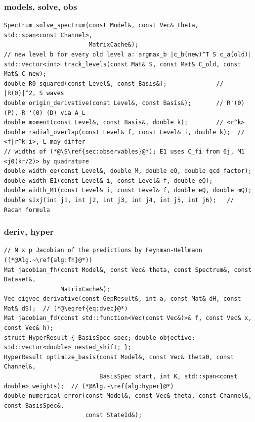 \documentclass[11pt,a4paper]{article}
\numberwithin{equation}{section}
\theoremstyle{definition}
\theoremstyle{plain}
\theoremstyle{remark}
\numberwithin{algorithm}{section}
\begin{document}
\subsubsection*{models, solve, obs}
\begin{lstlisting}[style=cpp]
Spectrum solve_spectrum(const Model&, const Vec& theta, std::span<const Channel>,
                        MatrixCache&);
// new level b for every old level a: argmax_b |c_b(new)^T S c_a(old)|
std::vector<int> track_levels(const Mat& S, const Mat& C_old, const Mat& C_new);
double R0_squared(const Level&, const Basis&);              // |R(0)|^2, S waves
double origin_derivative(const Level&, const Basis&);       // R'(0) (P), R''(0) (D) via A_L
double moment(const Level&, const Basis&, double k);        // <r^k>
double radial_overlap(const Level& f, const Level& i, double k);  // <f|r^k|i>, L may differ
// widths of (*@\S\ref{sec:observables}@*); E1 uses C_fi from 6j, M1 <j0(kr/2)> by quadrature
double width_ee(const Level&, double M, double eQ, double qcd_factor);
double width_E1(const Level& i, const Level& f, double eQ);
double width_M1(const Level& i, const Level& f, double eQ, double mQ);
double sixj(int j1, int j2, int j3, int j4, int j5, int j6);   // Racah formula
\end{lstlisting}

\subsubsection*{deriv, hyper}
\begin{lstlisting}[style=cpp]
// N x p Jacobian of the predictions by Feynman-Hellmann ((*@Alg.~\ref{alg:fh}@*))
Mat jacobian_fh(const Model&, const Vec& theta, const Spectrum&, const Dataset&,
                MatrixCache&);
Vec eigvec_derivative(const GepResult&, int a, const Mat& dH, const Mat& dS);  // (*@\eqref{eq:dvec}@*)
Mat jacobian_fd(const std::function<Vec(const Vec&)>& f, const Vec& x, const Vec& h);
struct HyperResult { BasisSpec spec; double objective; std::vector<double> nested_shift; };
HyperResult optimize_basis(const Model&, const Vec& theta0, const Channel&,
                           BasisSpec start, int K, std::span<const double> weights);  // (*@Alg.~\ref{alg:hyper}@*)
double numerical_error(const Model&, const Vec& theta, const Channel&, const BasisSpec&,
                       const StateId&);
\end{lstlisting}
\end{document}
